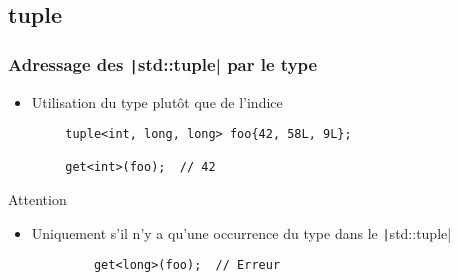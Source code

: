 \documentclass[C++.tex]{subfiles}
\begin{document}
\subsection*{tuple}
\begin{frame}[fragile]
	\frametitle{Adressage des \texttt|std::tuple| par le type}
	\begin{itemize}
		\item Utilisation du type plutôt que de l'indice
	\end{itemize}

	\begin{verbatim}
		tuple<int, long, long> foo{42, 58L, 9L};

		get<int>(foo);  // 42
	\end{verbatim}

	\begin{alertblock}{Attention}
		\begin{itemize}
			\item Uniquement s'il n'y a qu'une occurrence du type dans le \texttt|std::tuple|
		\end{itemize}

		\begin{verbatim}
			get<long>(foo);  // Erreur
		\end{verbatim}
	\end{alertblock}


\end{frame}
\end{document}
